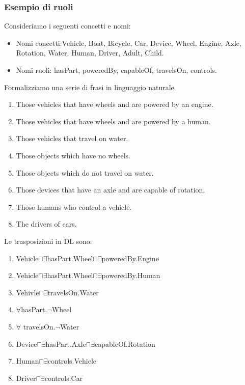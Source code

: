\documentclass[../main.tex]{subfiles}
\begin{document}
   \subsubsection{Esempio di ruoli}
   Consideriamo i seguenti concetti e nomi:
   \begin{itemize}
      \item Nomi concetti:Vehicle, Boat, Bicycle, Car, Device, Wheel, Engine, Axle, Rotation, Water, Human, Driver, Adult, Child.
      \item Nomi ruoli: hasPart, poweredBy, capableOf, travelsOn, controls.
   \end{itemize}
   Formalizziamo una serie di frasi in linguaggio naturale.
   \begin{enumerate}
      \item Those vehicles that have wheels and are powered by an engine.
      \item Those vehicles that have wheels and are powered by a human.
      \item Those vehicles that travel on water.
      \item Those objects which have no wheels.
      \item Those objects which do not travel on water.
      \item Those devices that have an axle and are capable of rotation.
      \item Those humans who control a vehicle.
      \item The drivers of cars.
   \end{enumerate}
   Le trasposizioni in DL sono:
   \begin{enumerate}
      \item Vehicle$\sqcap \exists$hasPart.Wheel$\sqcap \exists$poweredBy.Engine
      \item Vehicle$\sqcap \exists$hasPart.Wheel$\sqcap \exists$poweredBy.Human
      \item Vehivle$\sqcap \exists$travelsOn.Water
      \item $\forall$hasPart.$\lnot$Wheel
      \item $\forall$ travelsOn.$\lnot$Water
      \item Device$\sqcap \exists$hasPart.Axle$\sqcap \exists$capableOf.Rotation
      \item Human$\sqcap \exists$controls.Vehicle
      \item Driver$\sqcap \exists$controls.Car
   \end{enumerate}
   \vspace{2em}
\end{document}
